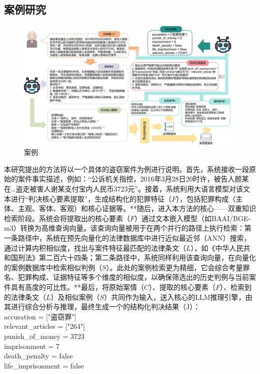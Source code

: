 \subsection{\heiti 案例研究}
\begin{figure}[htpb]
    \centering
    \includegraphics[width=0.8\linewidth]{fig/case.pdf}
    \caption{案例}
    \label{fig:case}
\end{figure}
本研究提出的方法将以一个具体的盗窃案件为例进行说明。首先，系统接收一段原始的案件事实描述，例如：“公诉机关指控，2016年3月28日20时许，被告人颜某在…盗走被害人谢某支付宝内人民币3723元”。接着，系统利用大语言模型对该文本进行“判决核心要素提取”，生成结构化的犯罪特征（$F$），包括犯罪构成（主体、主观、客体、客观）和核心证据等。**随后，进入本方法的核心——双重知识检索阶段。系统会将提取出的核心要素（$F$）通过文本嵌入模型（如BAAI/BGE-m3）转换为高维查询向量。该查询向量被用于在两个并行的路径上执行检索：第一条路径中，系统在预先向量化的法律数据库中进行近似最近邻（ANN）搜索，通过计算内积相似度，找出与案件特征最匹配的法律条文（$L$），如《中华人民共和国刑法》第二百六十四条；第二条路径中，系统同样利用该查询向量，在向量化的案例数据库中检索相似判例（$S$）。此处的案例检索更为精细，它会综合考量罪名、犯罪构成、证据特征等多个维度的相似度，以确保筛选出的历史判例与当前案件具有高度的可比性。**最后，将原始案情（$C$）、提取的核心要素（$F$）、检索到的法律条文（$L$）及相似案例（$S$）共同作为输入，送入核心的LLM推理引擎，由其进行综合分析与推理，最终生成一个的结构化判决结果（J）：
\\
accusation = ["盗窃罪"]
\\
relevant\_articles = ["264"]
\\
punish\_of\_money = 3723
\\
imprisonment = 7
\\
death\_penalty = false
\\
life\_imprisonment = false

